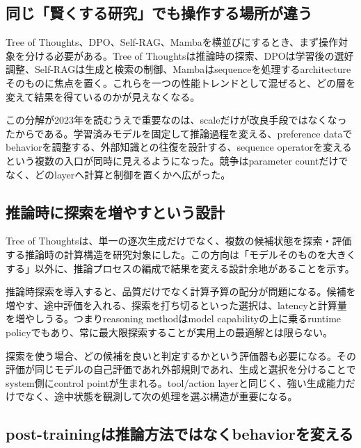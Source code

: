 
\subsection{同じ「賢くする研究」でも操作する場所が違う}

Tree of Thoughts、DPO、Self-RAG、Mambaを横並びにするとき、まず操作対象を分ける必要がある。Tree of Thoughtsは推論時の探索、DPOは学習後の選好調整、Self-RAGは生成と検索の制御、Mambaはsequenceを処理するarchitectureそのものに焦点を置く。これらを一つの性能トレンドとして混ぜると、どの層を変えて結果を得ているのかが見えなくなる。\autocite{src-21aef0026892,src-5dd64e15cc75,src-8a38211129c4,src-e413c7ab8da4}


この分解が2023年を読むうえで重要なのは、scaleだけが改良手段ではなくなったからである。学習済みモデルを固定して推論過程を変える、preference dataでbehaviorを調整する、外部知識との往復を設計する、sequence operatorを変えるという複数の入口が同時に見えるようになった。競争はparameter countだけでなく、どのlayerへ計算と制御を置くかへ広がった。\autocite{src-21aef0026892,src-5dd64e15cc75,src-8a38211129c4,src-e413c7ab8da4}


\subsection{推論時に探索を増やすという設計}

Tree of Thoughtsは、単一の逐次生成だけでなく、複数の候補状態を探索・評価する推論時の計算構造を研究対象にした。この方向は「モデルそのものを大きくする」以外に、推論プロセスの編成で結果を変える設計余地があることを示す。\autocite{src-8a38211129c4}


推論時探索を導入すると、品質だけでなく計算予算の配分が問題になる。候補を増やす、途中評価を入れる、探索を打ち切るといった選択は、latencyと計算量を増やしうる。つまりreasoning methodはmodel capabilityの上に乗るruntime policyでもあり、常に最大限探索することが実用上の最適解とは限らない。\autocite{src-8a38211129c4}


探索を使う場合、どの候補を良いと判定するかという評価器も必要になる。その評価が同じモデルの自己評価であれ外部規則であれ、生成と選択を分けることでsystem側にcontrol pointが生まれる。tool/action layerと同じく、強い生成能力だけでなく、途中状態を観測して次の処理を選ぶ構造が重要になる。\autocite{src-8a38211129c4}


\subsection{post-trainingは推論方法ではなくbehaviorを変える}

